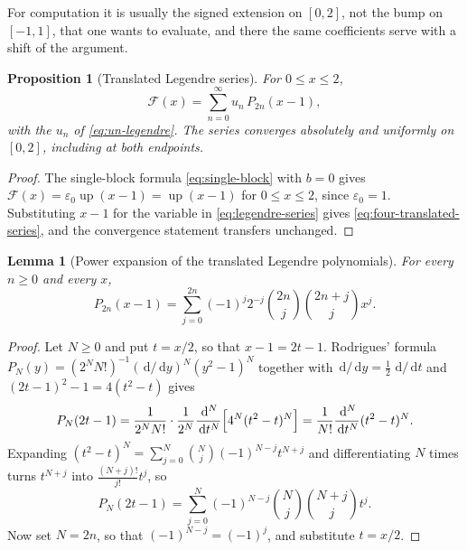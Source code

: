 \documentclass[11pt,oneside]{article}
\newtheorem{proposition}[theorem]{Proposition}
\newtheorem{lemma}[theorem]{Lemma}
\theoremstyle{definition}
\theoremstyle{remark}
\newcommand{\Up}{\operatorname{up}}
\newcommand{\dd}{\,\mathrm d}
\begin{document}
For computation it is usually the signed extension on $[0,2]$, not the bump on $[-1,1]$, that
one wants to evaluate, and there the same coefficients serve with a shift of the argument.

\begin{proposition}[Translated Legendre series]
\label{prop:four-translated-legendre}
For $0\le x\le2$,
\begin{equation}
 \mathcal F(x)=\sum_{n=0}^{\infty}u_n\,P_{2n}(x-1),        \label{eq:four-translated-series}
\end{equation}
with the $u_n$ of \eqref{eq:un-legendre}.  The series converges absolutely and uniformly on
$[0,2]$, including at both endpoints.
\end{proposition}

\begin{proof}
The single-block formula \eqref{eq:single-block} with $b=0$ gives
$\mathcal F(x)=\varepsilon_0\Up(x-1)=\Up(x-1)$ for $0\le x\le2$, since
$\varepsilon_0=1$.  Substituting $x-1$ for the variable in \eqref{eq:legendre-series} gives
\eqref{eq:four-translated-series}, and the convergence statement transfers unchanged.
\end{proof}

\begin{lemma}[Power expansion of the translated Legendre polynomials]
\label{lem:four-shifted-legendre}
For every $n\ge0$ and every $x$,
\begin{equation}
 P_{2n}(x-1)=\sum_{j=0}^{2n}(-1)^j 2^{-j}
 \binom{2n}{j}\binom{2n+j}{j}x^j.                         \label{eq:four-shifted-legendre}
\end{equation}
\end{lemma}

\begin{proof}
Let $N\ge0$ and put $t=x/2$, so that $x-1=2t-1$.  Rodrigues' formula
$P_N(y)=(2^NN!)^{-1}(\dd/\dd y)^N(y^2-1)^N$ together with $\dd/\dd y=\tfrac12\,\dd/\dd t$ and
$(2t-1)^2-1=4(t^2-t)$ gives
\begin{equation*}
 P_N(2t-1)
 =\frac{1}{2^NN!}\cdot\frac{1}{2^N}\frac{\dd^N}{\dd t^N}\Bigl[4^N(t^2-t)^N\Bigr]
 =\frac{1}{N!}\frac{\dd^N}{\dd t^N}(t^2-t)^N .
\end{equation*}
Expanding $(t^2-t)^N=\sum_{j=0}^{N}\binom Nj(-1)^{N-j}t^{N+j}$ and differentiating $N$ times
turns $t^{N+j}$ into $\frac{(N+j)!}{j!}t^{j}$, so
\begin{equation*}
 P_N(2t-1)=\sum_{j=0}^{N}(-1)^{N-j}\binom Nj\binom{N+j}{j}t^j .
\end{equation*}
Now set $N=2n$, so that $(-1)^{N-j}=(-1)^j$, and substitute $t=x/2$.
\end{proof}
\end{document}
